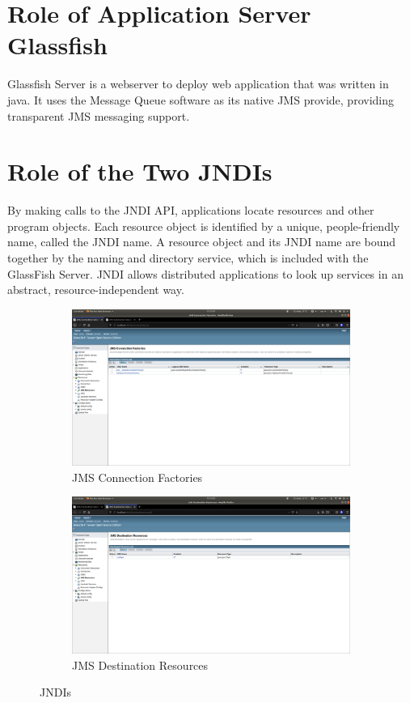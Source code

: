 \documentclass[11pt,a4paper]{article}
\begin{document}
	\section{Role of Application Server Glassfish}
	\label{sec:glassfish}
	Glassfish Server is a webserver to deploy web application that was written in java. It uses the Message Queue software as its native JMS provide, providing transparent JMS messaging support.
	\section{Role of the Two JNDIs}
	\label{sec:jndi}
	By making calls to the JNDI API, applications locate resources and other program objects. Each resource object is identified by a unique, people-friendly name, called the JNDI name. A resource object and its JNDI name are bound together by the naming and directory service, which is included with the GlassFish Server. JNDI allows distributed applications to look up services in an abstract, resource-independent way.
	\begin{figure}[h!]
		\centering
  		\begin{subfigure}[b]{0.4\linewidth}
  		\includegraphics[width=\linewidth]{jndi1.png}
    		\caption{JMS Connection Factories}
  		\end{subfigure}
  		\begin{subfigure}[b]{0.4\linewidth}
    		\includegraphics[width=\linewidth]{jndi2.png}
    		\caption{JMS Destination Resources}
  		\end{subfigure}
  		\caption{JNDIs}
  		\label{fig:jndi}
	\end{figure}
\end{document}
